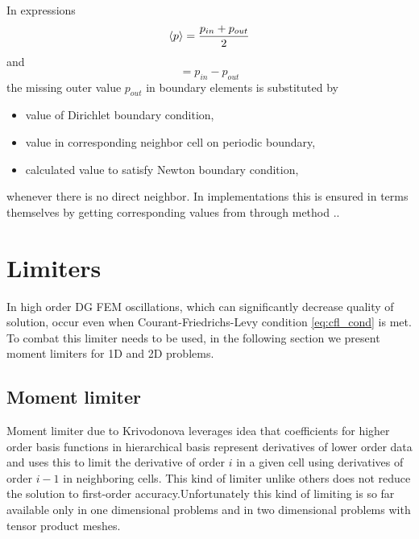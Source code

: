 In expressions
\begin{equation}
	  \langle p\rangle = \frac{p_{in} + p_{out}}{2}
\end{equation}
and 
\begin{equation}
	[p] = p_{in} - p_{out}
\end{equation}
the missing outer value $p_{out}$ in boundary elements is substituted by
\begin{itemize}
	\item value of Dirichlet boundary condition, 
	\item value in corresponding neighbor cell on periodic boundary,
	\item calculated value to satisfy Newton boundary condition,
\end{itemize} 
whenever there is no direct neighbor.
In implementations this is ensured in terms themselves by getting corresponding values 
from  through method ..

\newpage
\section{Limiters}
\label{se:limiters}
In high order DG FEM oscillations, which can significantly decrease quality of 
solution, occur even when Courant-Friedrichs-Levy condition \eqref{eq:cfl_cond} is met. 
To combat this limiter needs to be used, in the following section we present moment 
limiters for 1D and 
2D problems.

\subsection{Moment limiter}
Moment limiter due to Krivodonova \cite{Krivodonova2007} leverages idea that 
coefficients for higher order basis functions in hierarchical basis represent 
derivatives of lower order data and uses this to limit the derivative of 
order $i$ in a given cell using derivatives of order $i - 1$ in neighboring 
cells. This kind of limiter unlike others does not reduce the solution to 
first-order accuracy.Unfortunately this kind of limiting is so far available 
only in one dimensional problems and in two dimensional problems with tensor 
product meshes.

